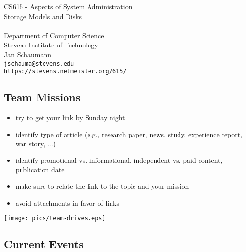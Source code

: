 \documentclass[xga]{xdvislides}
\begin{document}
\setfontphv

\lhead{\slidetitle}				%
\cfoot{\relax}					%
\rfoot{\Gray{\today}}

\vspace*{\fill}
\begin{center}
	\Hugesize
		CS615 - Aspects of System Administration\\ [1em]
		Storage Models and Disks\\ [1em]
	\hspace*{5mm}\blueline\\ [1em]
	\Normalsize
		Department of Computer Science\\
		Stevens Institute of Technology\\
		Jan Schaumann\\
		\verb+jschauma@stevens.edu+ \\
		\verb+https://stevens.netmeister.org/615/+
\end{center}
\vspace*{\fill}

\subsection{Team Missions}

\begin{itemize}
	\item try to get your link by Sunday night
	\item identify type of article (e.g., research paper, news, study, experience report, war story, ...)
	\item identify promotional vs. informational, independent vs. paid content, publication date
	\item make sure to relate the link to the topic and your mission
	\item avoid attachments in favor of links
\end{itemize}

\vfill
\begin{center}
	\texttt{[image: pics/team-drives.eps]} \\
\end{center}
\vfill

\subsection{Current Events}
\end{document}
